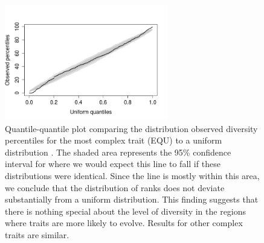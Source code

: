 \begin{figure}[t]
\begin{center}
\includegraphics[width=2.8in]{figs/localdiversity.png}
\caption{Quantile-quantile plot comparing the distribution observed diversity percentiles for the most complex trait (EQU) to a uniform distribution \citep{oldford_qqtest:_2016}. The shaded area represents the 95\% confidence interval for where we would expect this line to fall if these distributions were identical. Since the line is mostly within this area, we conclude that the distribution of ranks does not deviate substantially from a uniform distribution. This finding suggests that there is nothing special about the level of diversity in the regions where traits are more likely to evolve. Results for other complex traits are similar.}
\label{diversity}
\end{center}
\end{figure}

